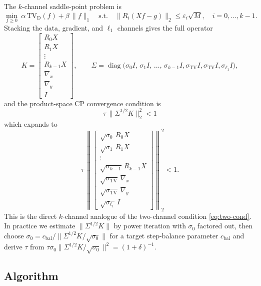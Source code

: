 \documentclass{article}
\newcommand{\diag}{\operatorname{diag}}
\newcommand{\eps}{\varepsilon}
\begin{document}
The $k$-channel saddle-point problem is
\begin{equation}\label{eq:cp-multi}
  \min_{f \ge 0}\ \alpha\, \mathrm{TV}_\text{D}(f) + \beta\, \|f\|_1
    \quad \text{s.t.}\quad
    \|R_i(X f - g)\|_2 \le \eps_i \sqrt{M},
    \quad i = 0, \ldots, k-1.
\end{equation}
Stacking the data, gradient, and $\ell_1$ channels gives the full
operator
\begin{equation}\label{eq:K-full}
  K = \begin{bmatrix}
    R_0 X \\ R_1 X \\ \vdots \\ R_{k-1} X \\
    \nabla_x \\ \nabla_y \\ I
  \end{bmatrix},
  \qquad
  \Sigma = \diag\big(\sigma_0 I,\, \sigma_1 I,\, \ldots,\, \sigma_{k-1} I,
    \sigma_\text{TV} I, \sigma_\text{TV} I, \sigma_{\ell_1} I\big),
\end{equation}
and the product-space CP convergence condition is
\begin{equation}\label{eq:cp-multi-cond}
  \boxed{\ \tau\, \|\Sigma^{1/2} K\|_2^2 < 1\ }
\end{equation}
which expands to
\begin{equation}\label{eq:cp-multi-explicit}
  \tau\, \left\|
  \begin{bmatrix}
    \sqrt{\sigma_0}\, R_0 X \\
    \sqrt{\sigma_1}\, R_1 X \\
    \vdots \\
    \sqrt{\sigma_{k-1}}\, R_{k-1} X \\
    \sqrt{\sigma_\text{TV}}\, \nabla_x \\
    \sqrt{\sigma_\text{TV}}\, \nabla_y \\
    \sqrt{\sigma_{\ell_1}}\, I
  \end{bmatrix}
  \right\|_2^2 < 1.
\end{equation}
This is the direct $k$-channel analogue of the two-channel condition
\eqref{eq:two-cond}. In practice we estimate $\|\Sigma^{1/2} K\|$ by
power iteration with $\sigma_0$ factored out, then choose
$\sigma_0 = c_\text{bal}/\|\Sigma^{1/2} K / \sqrt{\sigma_0}\|$ for a
target step-balance parameter $c_\text{bal}$ and derive $\tau$ from
$\tau \sigma_0 \|\Sigma^{1/2} K / \sqrt{\sigma_0}\|^2 = (1+\delta)^{-1}$.

\subsection{Algorithm}
\end{document}
